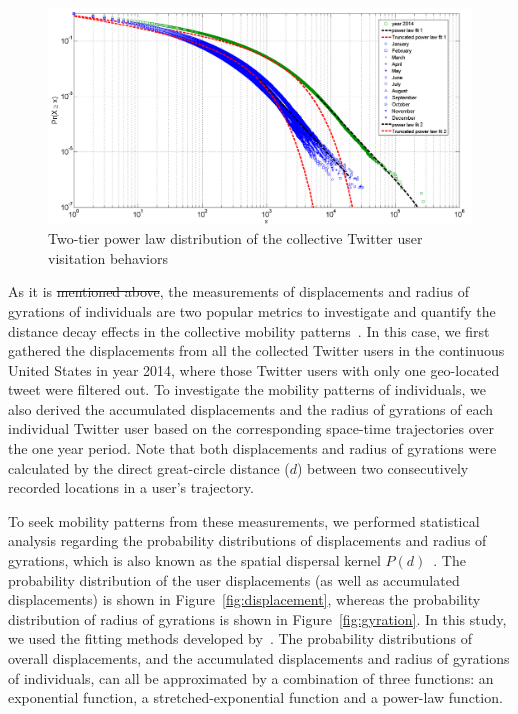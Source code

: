 \documentclass[ijgi,article,submit,moreauthors,pdftex,10pt,a4paper]{mdpi}
\theoremstyle{mdpi}
\newcounter{ex}
\newcounter{re}
\theoremstyle{mdpidefinition}
\providecommand{\DIFadd}[1]{{\protect\color{blue}\uwave{#1}}} %
\providecommand{\DIFdel}[1]{{\protect\color{red}\sout{#1}}}                      %
\providecommand{\DIFaddbegin}{} %
\providecommand{\DIFaddend}{} %
\providecommand{\DIFdelbegin}{} %
\providecommand{\DIFdelend}{} %
\providecommand{\DIFaddbeginFL}{} %
\providecommand{\DIFaddendFL}{} %
\providecommand{\DIFdelbeginFL}{} %
\providecommand{\DIFdelendFL}{} %
\begin{document}
\DIFdelbegin %
\DIFdelend \DIFaddbegin \begin{figure}[ht]
\DIFaddendFL \centering
\DIFdelbeginFL %
\DIFdelendFL \DIFaddbeginFL \includegraphics[width=1.0\linewidth]{./figures/visitation}
\DIFaddendFL \caption{Two-tier power law distribution of the collective Twitter user visitation behaviors}
\label{fig:visitation}
\end{figure}
\FloatBarrier

As it is \DIFdelbegin \DIFdel{mentioned above}\DIFdelend \DIFaddbegin \DIFadd{aforementioned}\DIFaddend , the measurements of displacements and radius of gyrations of individuals are two popular metrics to investigate and quantify the distance decay effects in the collective mobility patterns~\cite{gonzalez2008understanding}.
In this case, we first gathered the displacements from all the collected Twitter users in the continuous United States in year 2014, where those Twitter users with only one geo-located tweet were filtered out. 
To investigate the mobility patterns of individuals, we also derived the accumulated displacements and the radius of gyrations of each individual Twitter user based on the corresponding space-time trajectories over the one year period.
Note that both displacements and radius of gyrations were calculated by the direct great-circle distance ($d$) between two consecutively recorded locations in a user's trajectory.

To seek mobility patterns from these measurements, we performed statistical analysis regarding the probability distributions of displacements and radius of gyrations, which is also known as the spatial dispersal kernel $P(d)$~\cite{brockmann2006scaling}.
The probability distribution of the user displacements (as well as accumulated displacements) is shown in Figure~\ref{fig:displacement}, whereas the probability distribution of radius of gyrations is shown in Figure~\ref{fig:gyration}. 
In this study, we used the fitting methods developed by~\cite{Jurdak2015}.
The probability distributions of overall displacements, and the accumulated displacements and radius of gyrations of individuals, can all be approximated by a combination of three functions: an exponential function, a stretched-exponential function and a power-law function.
\end{document}
